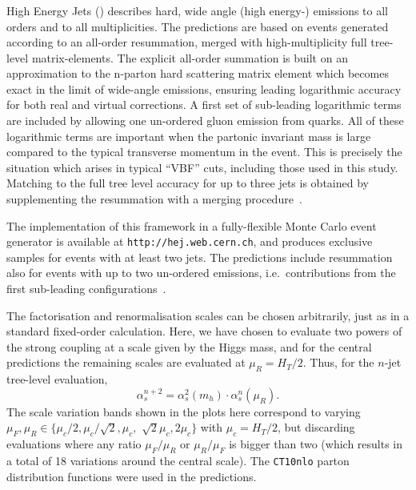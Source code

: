 \subsubsection{\Hej}
\label{sec:hjetscomp:tools:bfkl:hej}

High Energy Jets (\Hej) describes hard, wide angle (high energy-)
emissions to all orders and to all multiplicities. The predictions are based
on events generated according to an all-order resummation, merged with
high-multiplicity full tree-level matrix-elements. The explicit all-order summation
is built on an approximation to the n-parton hard scattering matrix element
\cite{Andersen:2009nu,Andersen:2009he,Andersen:2011hs} which becomes exact in
the limit of wide-angle emissions, ensuring leading logarithmic accuracy for
both real and virtual corrections. A first set of sub-leading logarithmic
terms are included by allowing one un-ordered gluon emission from quarks. All
of these logarithmic terms are important when
the partonic invariant mass is large compared to the typical transverse
momentum in the event. This is precisely the situation which arises in
typical ``VBF'' cuts, including those used in this study.  Matching to the
full tree level accuracy for up to three jets is obtained by supplementing
the resummation with a merging
procedure~\cite{Andersen:2008ue,Andersen:2008gc}.

The implementation of this framework in a fully-flexible Monte Carlo event
generator is available at \texttt{http://hej.web.cern.ch}, and produces
exclusive samples for events with at least two jets.  The predictions include
resummation also for events with up to two un-ordered emissions,
i.e.~contributions from the first sub-leading configurations~\cite{Andersen:2014xx}.

The factorisation and renormalisation scales can be chosen arbitrarily, just
as in a standard fixed-order calculation. Here, we have chosen to evaluate
two powers of the strong coupling at a scale given by the Higgs mass, and for
the central predictions the remaining scales are evaluated at $\mu_R=H_T/2$. Thus,
for the $n$-jet tree-level evaluation, 
\begin{equation}
  \alpha_s^{n+2}=\alpha^2_s(m_h)\cdot \alpha^n_s(\mu_R).
\end{equation}
The scale variation bands shown in the plots here correspond to varying
$\mu_F,\mu_R\in \{\mu_c/2, \mu_c/\sqrt{2}, \mu_c,$ $\sqrt{2}\mu_c, 2\mu_c\}$ with 
$\mu_c=H_T/2$, but discarding evaluations where any ratio $\mu_F/\mu_R$ or 
$\mu_R/\mu_F$ is bigger than two (which results in a total of 18 variations
around the central scale). The \texttt{CT10nlo} \cite{Lai:2010vv,Gao:2013xoa} parton 
distribution functions were used in the predictions.
